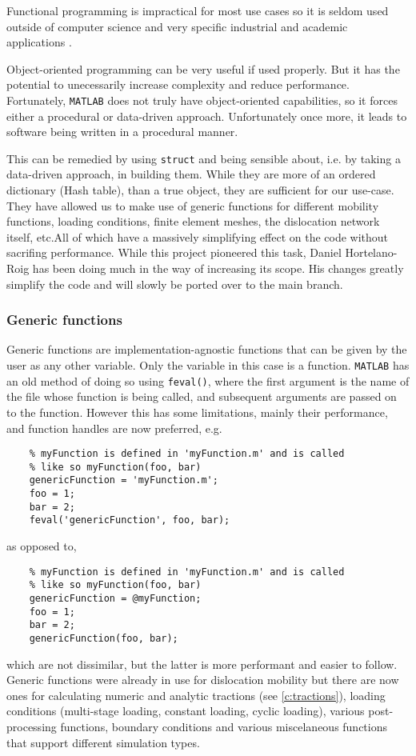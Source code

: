 Functional programming is impractical for most use cases so it is seldom used outside of computer science and very specific industrial and academic applications \cite{haskell,functionalProg}.

Object-oriented programming can be very useful if used properly. But it has the potential to unecessarily increase complexity and reduce performance. Fortunately, \texttt{MATLAB} does not truly have object-oriented capabilities, so it forces either a procedural or data-driven approach. Unfortunately once more, it leads to software being written in a procedural manner.

This can be remedied by using \texttt{struct} and being sensible about, i.e. by taking a data-driven approach, in building them. While they are more of an ordered dictionary (Hash table), than a true object, they are sufficient for our use-case. They have allowed us to make use of generic functions for different mobility functions, loading conditions, finite element meshes, the dislocation network itself, etc.All of which have a massively simplifying effect on the code without sacrifing performance. While this project pioneered this task, Daniel Hortelano-Roig has been doing much in the way of increasing its scope. His changes greatly simplify the code and will slowly be ported over to the main branch.

\subsubsection{Generic functions}

Generic functions are implementation-agnostic functions that can be given by the user as any other variable. Only the variable in this case is a function. \texttt{MATLAB} has an old method of doing so using \texttt{feval()}, where the first argument is the name of the file whose function is being called, and subsequent arguments are passed on to the function. However this has some limitations, mainly their performance, and function handles are now preferred, e.g.
\begin{verbatim}
    % myFunction is defined in 'myFunction.m' and is called 
    % like so myFunction(foo, bar)
    genericFunction = 'myFunction.m'; 
    foo = 1;
    bar = 2;
    feval('genericFunction', foo, bar);
\end{verbatim}
as opposed to,
\begin{verbatim}
    % myFunction is defined in 'myFunction.m' and is called 
    % like so myFunction(foo, bar)
    genericFunction = @myFunction; 
    foo = 1;
    bar = 2;
    genericFunction(foo, bar);
\end{verbatim}
which are not dissimilar, but the latter is more performant and easier to follow. Generic functions were already in use for dislocation mobility but there are now ones for calculating numeric and analytic tractions (see \cref{c:tractions}), loading conditions (multi-stage loading, constant loading, cyclic loading), various post-processing functions, boundary conditions and various miscelaneous functions that support different simulation types.

